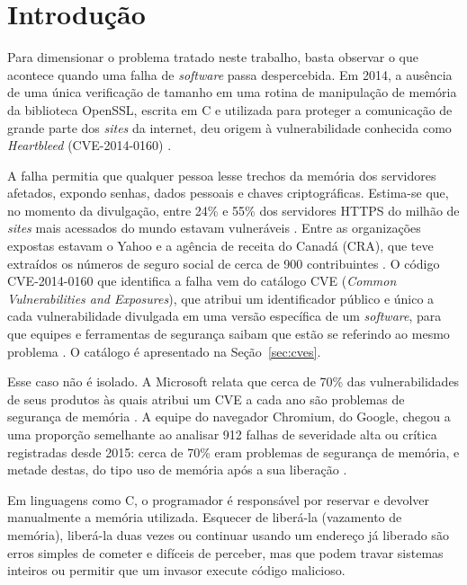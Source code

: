 \documentclass[
    12pt,                %
    openright,           %
    oneside,             %
    a4paper,             %
    english,             %
    brazil               %
]{abntex2}
\begin{document}
\chapter{Introdução}
\label{cap:introducao}
\par
Para dimensionar o problema tratado neste trabalho, basta observar o que acontece quando uma falha de \textit{software} passa despercebida.
Em 2014, a ausência de uma única verificação de tamanho em uma rotina de manipulação de memória da biblioteca OpenSSL, escrita em C e utilizada para proteger a comunicação de grande parte dos \textit{sites} da internet, deu origem à vulnerabilidade conhecida como \textit{Heartbleed} (CVE-2014-0160) \cite{durumeric2014heartbleed}.
\par
A falha permitia que qualquer pessoa lesse trechos da memória dos servidores afetados, expondo senhas, dados pessoais e chaves criptográficas.
Estima-se que, no momento da divulgação, entre 24\% e 55\% dos servidores HTTPS do milhão de \textit{sites} mais acessados do mundo estavam vulneráveis \cite{durumeric2014heartbleed}. 
Entre as organizações expostas estavam o Yahoo \cite{wilhelm2014techcrunch} e a agência de receita do Canadá (CRA), que teve extraídos os números de seguro social de cerca de 900 contribuintes \cite{williams2014computerworld}.
O código CVE-2014-0160 que identifica a falha vem do catálogo CVE (\textit{Common Vulnerabilities and Exposures}), que atribui um identificador público e único a cada vulnerabilidade divulgada em uma versão específica de um \textit{software}, para que equipes e ferramentas de segurança saibam que estão se referindo ao mesmo problema \cite{cveabout}.
O catálogo é apresentado na Seção~\ref{sec:cves}.
\par
Esse caso não é isolado.
A Microsoft relata que cerca de 70\% das vulnerabilidades de seus produtos às quais atribui um CVE a cada ano são problemas de segurança de memória \cite{msrc2019proactive}.
A equipe do navegador Chromium, do Google, chegou a uma proporção semelhante ao analisar 912 falhas de severidade alta ou crítica registradas desde 2015: cerca de 70\% eram problemas de segurança de memória, e metade destas, do tipo uso de memória após a sua liberação \cite{chromium2020memorysafety}.
\par
Em linguagens como C, o programador é responsável por reservar e devolver manualmente a memória utilizada.
Esquecer de liberá-la (vazamento de memória), liberá-la duas vezes ou continuar usando um endereço já liberado são erros simples de cometer e difíceis de perceber, mas que podem travar sistemas inteiros ou permitir que um invasor execute código malicioso.
\end{document}
